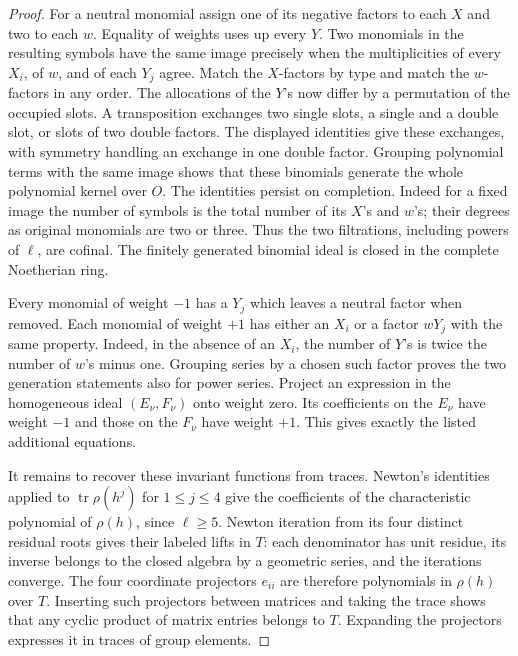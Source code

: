 \documentclass[a4paper,11pt]{article}
\theoremstyle{definition}
\theoremstyle{remark}
\numberwithin{equation}{section}
\begin{document}
\begin{proof}
For a neutral monomial assign one of its negative factors to
each \(X\) and two to each \(w\). Equality of weights uses up
every \(Y\). Two monomials in the resulting symbols have the
same image precisely when the multiplicities of every \(X_i\),
of \(w\), and of each \(Y_j\) agree. Match the \(X\)-factors
by type and match the \(w\)-factors in any order. The allocations
of the \(Y\)'s now differ by a permutation of the occupied slots.
A transposition exchanges two single slots, a single and a double
slot, or slots of two double factors. The displayed identities
give these exchanges, with symmetry handling an exchange in one
double factor. Grouping polynomial terms with the same image
shows that these binomials generate the whole polynomial kernel
over \(O\). The identities persist on completion. Indeed for a
fixed image the number of symbols is the total number of its
\(X\)'s and \(w\)'s; their degrees as original monomials are two
or three. Thus the two filtrations, including powers of \(\ell\),
are cofinal. The finitely generated binomial ideal is closed in
the complete Noetherian ring.

Every monomial of weight \(-1\) has a \(Y_j\) which leaves a
neutral factor when removed. Each monomial of weight \(+1\)
has either an \(X_i\) or a factor \(wY_j\) with the same property.
Indeed, in the absence of an \(X_i\), the number of \(Y\)'s is
twice the number of \(w\)'s minus one. Grouping series by a
chosen such factor proves the two generation statements also
for power series. Project an expression in the homogeneous ideal
\((E_\nu,F_\nu)\) onto weight zero. Its coefficients on the
\(E_\nu\) have weight \(-1\) and those on the \(F_\nu\) have
weight \(+1\). This gives exactly the listed additional equations.

It remains to recover these invariant functions from traces.
Newton's identities applied to \(\operatorname{tr}\rho(h^j)\)
for \(1\le j\le4\) give the coefficients of the characteristic
polynomial of \(\rho(h)\), since \(\ell\ge5\). Newton iteration
from its four distinct residual roots gives their labeled lifts
in \(T\): each denominator has unit residue, its inverse belongs
to the closed algebra by a geometric series, and the iterations
converge. The four coordinate projectors \(e_{ii}\) are therefore
polynomials in \(\rho(h)\) over \(T\). Inserting such projectors
between matrices and taking the trace shows that any cyclic
product of matrix entries belongs to \(T\). Expanding the
projectors expresses it in traces of group elements.


\end{proof}
\end{document}
